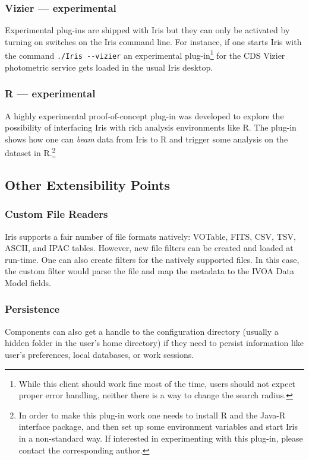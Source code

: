\documentclass[preprint,authoryear,5p]{elsarticle}
\begin{document}
\subsubsection{Vizier --- experimental} \label{sec:asdc} Experimental plug-ins
are shipped with Iris but they can only be activated by turning on switches on
the Iris command line. For instance, if one starts Iris with the command
\verb|./Iris --vizier| an experimental plug-in\footnote{While this client should work
fine most of the time,
users should not expect proper error handling, neither there is a way to
change the search radius.} for the CDS Vizier photometric
service gets loaded in the usual Iris desktop.

\subsubsection{R --- experimental} A highly experimental proof-of-concept
plug-in was developed to explore the possibility of interfacing Iris with rich
analysis environments like R. The plug-in shows how one can \emph{beam} data
from Iris to R and trigger some analysis on the dataset in R.\footnote{In order
to make this plug-in work one needs to install R and the Java-R interface package, and then
set up some environment variables and start Iris in a non-standard way.
If interested in experimenting with this plug-in,
please contact the corresponding author.}


\subsection{Other Extensibility Points}

\subsubsection{Custom File Readers} Iris supports a fair number of file formats
natively: VOTable, FITS, CSV, TSV, ASCII, and IPAC tables. However, new file
filters can be created and loaded at run-time. One can also create filters for
the natively supported files. In this case, the custom filter would parse the
file and map the metadata to the IVOA Data Model fields.

\subsubsection{Persistence} Components can also get a handle to the
configuration directory (usually a hidden folder in the user's home directory)
if they need to persist information like user's preferences, local databases, or
work sessions.
\end{document}
